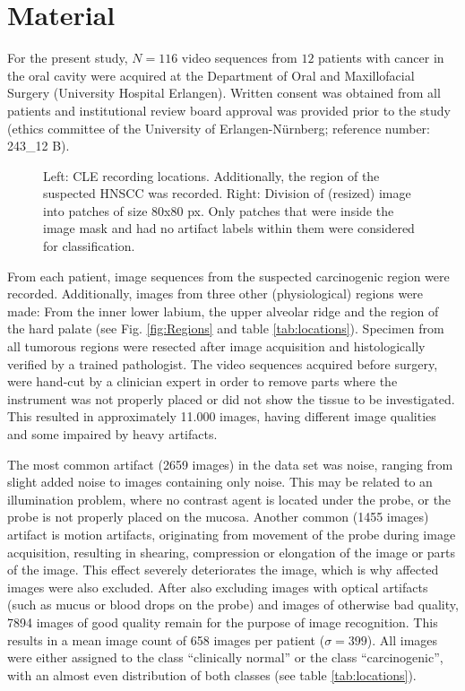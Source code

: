 \documentclass[fleqn,10pt]{wlscirep}
\begin{document}
\section{Material}
For the present study, $N=116$ video sequences from $12$ patients with cancer in
the oral cavity were acquired at the Department of Oral and Maxillofacial Surgery (University Hospital Erlangen). Written consent was obtained from all patients and institutional review board approval
was provided prior to the study (ethics committee of the University of Erlangen-N{\"u}rnberg; reference number: 243\_12 B).

\begin{figure}[!t]
\centering
{}
\caption{Left: CLE recording locations. Additionally, the region of the
  suspected HNSCC was recorded. Right: Division of (resized) image into patches of size 80x80 px. Only
  patches that were inside the image mask and had no artifact labels
  within them were considered for classification.}
\end{figure}

From each patient, image sequences from the suspected carcinogenic region
were recorded. Additionally, images from three other (physiological) regions were made: From the inner lower
labium, the upper alveolar ridge and the region of the hard palate (see
Fig. \ref{fig:Regions} and table \ref{tab:locations}). Specimen from all tumorous regions were resected after image acquisition and
histologically verified by a trained pathologist. The video
sequences acquired before surgery, were hand-cut
by a clinician expert in order to remove parts where the instrument was not
properly placed or did not show the tissue to be investigated. This resulted in
approximately 11.000 images, having different image qualities and some
impaired by heavy artifacts.

The most common artifact (2659 images) in the data set was noise,
ranging from slight added noise to images containing only noise.
This may be related to an illumination problem, where no contrast
agent is located under the probe, or the probe is not properly placed
on the mucosa.
Another common (1455 images) artifact is motion artifacts, originating from movement of the probe during image acquisition, resulting in shearing, compression or elongation of the image or parts of the image. This effect severely deteriorates the image, which is why affected images were also excluded.
After also excluding images with optical artifacts (such as mucus or blood drops on the probe) and images of otherwise bad quality, 7894 %
 images of good quality remain for the purpose of image recognition. This results in a mean image count of 658 images per patient ($\sigma=399$). All images were either assigned to the class ``clinically normal'' or the class ``carcinogenic'', with an almost even distribution of both classes (see table \ref{tab:locations}).
\end{document}
